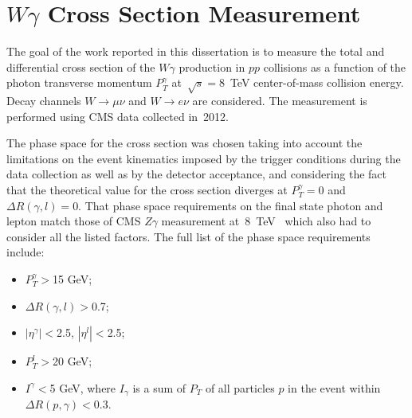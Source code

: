 \chapter{$W\gamma$ Cross Section Measurement}
\label{sec:AN_WgMeas}

The goal of the work reported in this dissertation is to measure the total and differential cross section of the $W\gamma$ production in $pp$ collisions as a function of the photon transverse momentum $P_T^\gamma$ at~$\sqrt{s}=8$~TeV center-of-mass collision energy. Decay channels $W\rightarrow\mu\nu$ and $W\rightarrow e\nu$ are considered. The measurement is performed using CMS data collected in~2012.

The phase space for the cross section was chosen taking into account the limitations on the event kinematics imposed by the trigger conditions during the data collection as well as by the detector acceptance, and considering the fact that the theoretical value for the cross section diverges at $P_T^{\gamma}=$0 and $\Delta{R}(\gamma,l)=$0. That phase space requirements on the final state photon and lepton match those of CMS $Z\gamma$ measurement at~8~TeV~\cite{ref_Zg8TeV} which also had to consider all the listed factors. The full list of the phase space requirements include:
\begin{itemize}
  \item $P_T^{\gamma}>$15 GeV;
  \item $\Delta{R}(\gamma,l) > $0.7;
  \item $|\eta^{\gamma}|<$2.5, $|\eta^{l}|<$2.5;
  \item $P_T^{l}>$20 GeV;
  \item $I^{\gamma}<$5 GeV, where $I_{\gamma}$ is a sum of $P_T$ of all particles $p$ in the event within $\Delta{R(p,\gamma)}<$0.3.
\end{itemize}
